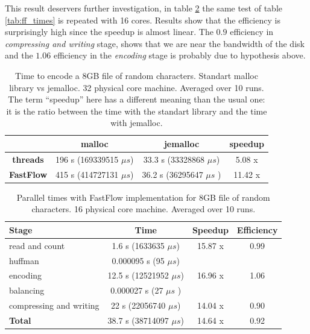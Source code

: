\documentclass[12pt, letterpaper]{article}
\begin{document}
This result deservers further investigation, in table \ref{tab:ff_times16} the same test of table \ref{tab:ff_times} is repeated with 16 cores. Results show that the efficiency is surprisingly high since the speedup is almost linear. The $0.9 $ efficiency in \textit{compressing and writing} stage, shows that we are near the bandwidth of the disk and the $1.06$ efficiency in the \textit{encoding} stage is probably due to hypothesis above.

\begin{table}[!h]
    \begin{center}
    \begin{tabular}{c c c c}
        & \textbf{malloc} & \textbf{jemalloc} & speedup\\
        \hline
        \textbf{threads} & 196 s (169339515 $\mu s$)  & 33.3 s  (33328868 $\mu s$) & 5.08 x \\
        \hline
        \textbf{FastFlow} &  415 s  (414727131 $\mu s$) & 36.2 s (36295647 $\mu s$ ) & 11.42 x \\
        \hline
    \end{tabular}
\caption{Time to encode a 8GB file of random characters. Standart malloc library vs jemalloc. 32 physical core machine. Averaged over 10 runs. The term ``speedup'' here has a different meaning than the usual one: it is the ratio between the time with the standart library and the time with jemalloc.}    
\label{tab:jemalloc}
\end{center}
\end{table}


\begin{table}[h]
    \begin{center}
    \begin{tabular}{l c c c}
        \textbf{Stage} & \textbf{Time} & \textbf{Speedup} & \textbf{Efficiency}  \\
        \hline
        read and count & 1.6 s (1633635 $\mu s$)  & 15.87 x & 0.99  \\
        \hline
        huffman & 0.000095 s (95 $\mu s$) & \\
        \hline
        encoding & 12.5 s (12521952 $\mu s$)  & 16.96 x & 1.06 \\
        \hline
        balancing & 0.000027 s (27 $\mu s$ ) & \\
        \hline
        compressing and writing & 22 s (22056740 $\mu s$)  & 14.04 x & 0.90\\
        \hline
        \textbf{Total} & 38.7 s (38714097 $\mu s$)  & 14.64 x & 0.92 \\ 
\end{tabular} 
\caption{Parallel times with FastFlow implementation for 8GB file of random characters. 16 physical core machine. Averaged over 10 runs.}    
\label{tab:ff_times16}
\end{center}
\end{table}
\end{document}
